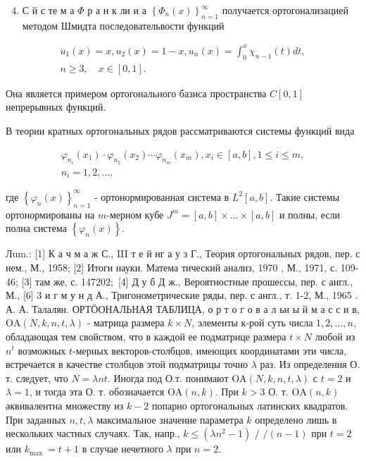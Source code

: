 \documentclass[10pt]{article}
\begin{document}
\begin{enumerate}
  \setcounter{enumi}{3}
  \item С й с те м а $\Phi$ р а н к ли и а $\left\{\Phi_{n}(x)\right\}_{n=1}^{\infty}$ получается ортогонализацией методом Шмидта последовательвости функций
\end{enumerate}

\[
\begin{gathered}
u_{1}(x)=x, u_{2}(x)=1-x, u_{n}(x)=\int_{0}^{x} \chi_{n-1}(t) d t, \\
n \geqslant 3, \quad x \in[0,1] .
\end{gathered}
\]

Она является примером ортогонального базиса пространства $C[0,1]$ непрерывных функций.

В теории кратных ортогональных рядов рассматриваются системы функций вида

\[
\begin{gathered}
\varphi_{n_{i}}\left(x_{1}\right) \cdot \varphi_{n_{2}}\left(x_{2}\right) \cdots \varphi_{n_{m}}\left(x_{m}\right), x_{i} \in[a, b], 1 \leqslant i \leqslant m, \\
n_{i}=1,2, \ldots,
\end{gathered}
\]

где $\left\{\varphi_{n}(x)\right\}_{n=1}^{\infty}$ - ортонормированная система в $L^{2}[a, b]$. Такие системы ортонормированы на $m$-мерном кубе $J^{m}=[a, b] \times \ldots \times[a, b]$ и полны, если полна система $\left\{\varphi_{n}(x)\right\}$.

Лum.: [1] К а ч м а ж С., III т е й нг а у з Г., Теория ортогональных рядов, пер. с нем., М., 1958; [2] Итоги науки. Матема тический анализ, 1970 , М., 1971, с. 109-46; [3] там же, с. 147$202 ;$ [4] Д у б Д ж., Вероятностные прошессы, пер. с англ., М., [6] 3 и г м у н д А., Тригонометрические ряды, пер. с англ., т. 1-2, М., 1965 . А. А. Талалян. ОРТӦОНАЛЬНАЯ ТАБЛИЦА, о р т о г о в а л ьн ы й м а с с и в, $\mathrm{OA}(N, k, n, t, \lambda)$ - матрица размера $k \times N$, элементы к-рой суть числа $1,2, \ldots, n$, обладающая тем свойством, что в каждой ее подматрице размера $t \times N$ любой из $n^{t}$ возможных $t$-мерных векторов-столбцов, имеющих координатами эти числа, встречается в качестве столбцов этой подматрицы точно $\lambda$ раз. Из определения О. т. следует, что $N=\lambda n t$. Иногда под О.т. понимают $\mathrm{OA}(N, k, n, t, \lambda)$ с $t=2$ и $\lambda=1$, и тогда эта О. т. обозначается $\mathrm{OA}(n, k)$. При $k>3$ О. т. $\mathrm{OA}(n, k)$ әквивалентна множеству из $k-2$ попарно ортогональных латинских квадратов. При заданных $n, t, \lambda$ максимальное значение параметра $k$ определено лишь в нескольких частных случаях. Так, напр., $k \leqslant\left(\lambda n^{2}-1\right)$ / $/(n-1)$ при $t=2$ или $k_{\text {max }}=t+1$ в случае нечетного $\lambda$ при $n=2$.
\end{document}
